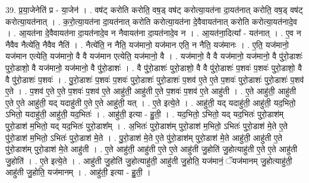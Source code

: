 \documentclass[17pt]{extarticle}
\begin{document}
39. प्र॒या॒जेनेति॑ प्र - या॒जेन॑ । . वष॑ट् करोति करोति॒ वष॒ड् वष॑ट् करोत्या॒यत॑ना दा॒यत॑नात् करोति॒ वष॒ड् वष॑ट् करोत्या॒यत॑नात् । . क॒रो॒त्या॒यत॑ना दा॒यत॑नात् करोति करोत्या॒यत॑ना दे॒वैवायत॑नात् करोति करोत्या॒यत॑नादे॒व । . आ॒यत॑ना दे॒वैवायत॑ना दा॒यत॑नादे॒व न नैवायत॑ना दा॒यत॑नादे॒व न । . आ॒यत॑ना॒दित्या᳚ - यत॑नात् । . ए॒व न नैवैव नैत्ये॑ति॒ नैवैव नैति॑ । . नैत्ये॑ति॒ न नैति॒ यज॑मानो॒ यज॑मान एति॒ न नैति॒ यज॑मानः । . ए॒ति॒ यज॑मानो॒ यज॑मान एत्येति॒ यज॑मानो॒ वै वै यज॑मान एत्येति॒ यज॑मानो॒ वै । . यज॑मानो॒ वै वै यज॑मानो॒ यज॑मानो॒ वै पु॑रो॒डाशः॑ पुरो॒डाशो॒ वै यज॑मानो॒ यज॑मानो॒ वै पु॑रो॒डाशः॑ । . वै पु॑रो॒डाशः॑ पुरो॒डाशो॒ वै वै पु॑रो॒डाशः॑ प॒शवः॑ प॒शवः॑ पुरो॒डाशो॒ वै वै पु॑रो॒डाशः॑ प॒शवः॑ । . पु॒रो॒डाशः॑ प॒शवः॑ प॒शवः॑ पुरो॒डाशः॑ पुरो॒डाशः॑ प॒शव॑ ए॒ते ए॒ते प॒शवः॑ पुरो॒डाशः॑ पुरो॒डाशः॑ प॒शव॑ ए॒ते । . प॒शव॑ ए॒ते ए॒ते प॒शवः॑ प॒शव॑ ए॒ते आहु॑ती॒ आहु॑ती ए॒ते प॒शवः॑ प॒शव॑ ए॒ते आहु॑ती । . ए॒ते आहु॑ती॒ आहु॑ती ए॒ते ए॒ते आहु॑ती॒ यद् यदाहु॑ती ए॒ते ए॒ते आहु॑ती॒ यत् । . ए॒ते इत्ये॒ते । . आहु॑ती॒ यद् यदाहु॑ती॒ आहु॑ती॒ यद॒भितो॒ ऽभितो॒ यदाहु॑ती॒ आहु॑ती॒ यद॒भितः॑ । . आहु॑ती॒ इत्या - हु॒ती॒ । . यद॒भितो॒ ऽभितो॒ यद् यद॒भितः॑ पुरो॒डाश॑म् पुरो॒डाश॑ म॒भितो॒ यद् यद॒भितः॑ पुरो॒डाश᳚म् । . अ॒भितः॑ पुरो॒डाश॑म् पुरो॒डाश॑ म॒भितो॒ ऽभितः॑ पुरो॒डाश॑ मे॒ते ए॒ते पु॑रो॒डाश॑ म॒भितो॒ ऽभितः॑ पुरो॒डाश॑ मे॒ते । . पु॒रो॒डाश॑ मे॒ते ए॒ते पु॑रो॒डाश॑म् पुरो॒डाश॑ मे॒ते आहु॑ती॒ आहु॑ती ए॒ते पु॑रो॒डाश॑म् पुरो॒डाश॑ मे॒ते आहु॑ती । . ए॒ते आहु॑ती॒ आहु॑ती ए॒ते ए॒ते आहु॑ती जु॒होति॑ जु॒होत्याहु॑ती ए॒ते ए॒ते आहु॑ती जु॒होति॑ । . ए॒ते इत्ये॒ते । . आहु॑ती जु॒होति॑ जु॒होत्याहु॑ती॒ आहु॑ती जु॒होति॒ यज॑मानं॒ ॅयज॑मानम् जु॒होत्याहु॑ती॒ आहु॑ती जु॒होति॒ यज॑मानम् । . आहु॑ती॒ इत्या - हु॒ती॒ । \newline
\pagebreak
{}
\end{document}

